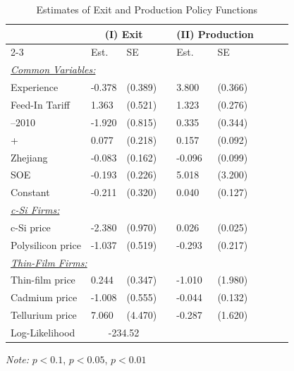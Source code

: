 \documentclass[12pt, letter]{article}
\begin{document}
\begin{table}[tbh]
\centering
\caption{Estimates of Exit and Production Policy Functions}
\label{tab:est_policy_func}
\begin{threeparttable}
\begin{tabularx}{0.75\textwidth}{Xllllllll}
\toprule
 & \multicolumn{2}{c}{(I) Exit } && \multicolumn{2}{c}{(II) Production } \\
\cmidrule{2-3} \cmidrule{5-6}
 & Est. & SE && Est. & SE \\
\midrule
\multicolumn{6}{l}{\underline{\textit{Common Variables:}}} \\
\quad Experience & -0.378 & (0.389) && 3.800\sym{***} & (0.366) \\
\quad Feed-In Tariff & 1.363\sym{***} & (0.521) && 1.323\sym{***} & (0.276) \\
\quad 2006–2010& -1.920\sym{**} & (0.815) && 0.335 & (0.344) \\
\quad 2011+& 0.077 & (0.218) && 0.157\sym{**} & (0.092) \\
\quad Zhejiang & -0.083 & (0.162) && -0.096 & (0.099) \\
\quad SOE & -0.193 & (0.226) && 5.018 & (3.200) \\
\quad Constant & -0.211 & (0.320) && 0.040 & (0.127) \\

\multicolumn{6}{l}{\underline{\textit{c-Si Firms:}}} \\
\quad c-Si price
  & -2.380\sym{**} & (0.970) && 0.026 & (0.025) \\
\quad Polysilicon price
  & -1.037\sym{**} & (0.519) && -0.293 & (0.217) \\

\multicolumn{6}{l}{\underline{\textit{Thin-Film Firms:}}} \\
\quad Thin-film price 
  & 0.244 & (0.347) && -1.010 & (1.980) \\
\quad Cadmium price
  & -1.008\sym{*} & (0.555)&& -0.044 & (0.132) \\
\quad Tellurium price
  & 7.060 & (4.470) && -0.287 & (1.620) \\
\midrule

Log-Likelihood 
  & \multicolumn{2}{c}{-234.52} && 
    \multicolumn{2}{c}{} \\

\bottomrule
\end{tabularx}

\begin{tablenotes}
  \begin{itemize}\setlength\itemsep{0em}
  \end{itemize}
  \item \textit{Note:} \sym{*} \(p<0.1\), \sym{**} \(p<0.05\), \sym{***} \(p<0.01\)
\end{tablenotes}

\end{threeparttable}
\end{table}
\end{document}
